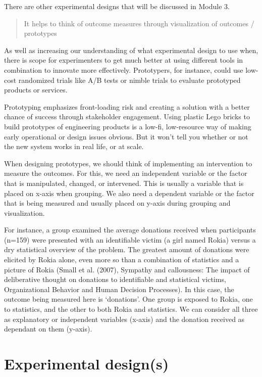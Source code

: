 \documentclass[openany]{book}
\begin{document}
There are other experimental designs that will be discussed in Module 3.

\begin{quote}
It helps to think of outcome measures through visualization of outcomes / prototypes
\end{quote}

As well as increasing our understanding of what experimental design to use when, there is scope for experimenters to get much better at using different tools in combination to innovate more effectively. Prototypers, for instance, could use low-cost randomized trials like A/B tests or nimble trials to evaluate prototyped products or services.

Prototyping emphasizes front-loading risk and creating a solution with a better chance of success through stakeholder engagement. Using plastic Lego bricks to build prototypes of engineering products is a low-fi, low-resource way of making early operational or design issues obvious. But it won't tell you whether or not the new system works in real life, or at scale.

When designing prototypes, we should think of implementing an intervention to measure the outcomes. For this, we need an independent variable or the factor that is manipulated, changed, or intervened. This is usually a variable that is placed on x-axis when grouping. We also need a dependent variable or the factor that is being measured and usually placed on y-axis during grouping and visualization.

For instance, a group examined the average donations received when participants (n=159) were presented with an identifiable victim (a girl named Rokia) versus a dry statistical overview of the
problem. The greatest amount of donations were elicited by Rokia alone, even more so than a combination of statistics and a picture of Rokia (Small et al. (2007), Sympathy and callousness: The impact of
deliberative thought on donations to identifiable and statistical victims, Organizational Behavior and Human Decision Processes).
In this case, the outcome being measured here is `donations'. One group is exposed to Rokia, one to statistics, and the other to both Rokia and statistics. We can consider all three as explanatory or independent variables (x-axis) and the donation received as dependant on them (y-axis).

\hypertarget{experimental-designs}{%
\section{Experimental design(s)}\label{experimental-designs}}
\end{document}
